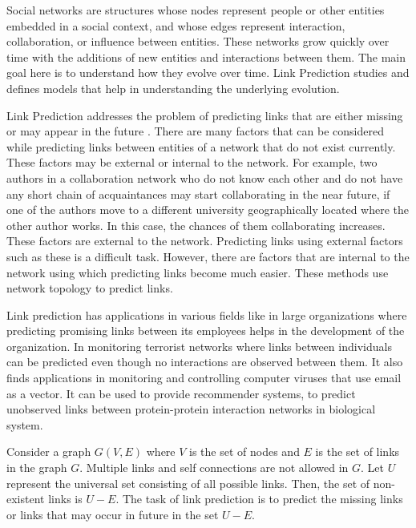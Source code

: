 Social networks are structures whose nodes represent people or other entities embedded in a social context, and whose edges represent interaction, collaboration, or influence between entities. These networks grow quickly over time with the additions of new entities and interactions between them. The main goal here is to understand how they evolve over time. Link Prediction studies and defines models that help in understanding the underlying evolution.

Link Prediction addresses the problem of predicting links that are either missing or may appear in the future \cite{liben2007link}. There are many factors that can be considered while predicting links between entities of a network that do not exist currently. These factors may be external or internal to the network. For example, two authors in a collaboration network who do not know each other and do not have any short chain of acquaintances may start collaborating in the near future, if one of the authors move to a different university geographically located where the other author works. In this case, the chances of them collaborating increases. These factors are external to the network. Predicting links using external factors such as these is a difficult task. However, there are factors that are internal to the network using which predicting links become much easier. These methods use network topology to predict links. 

Link prediction has applications in various fields like in large organizations where predicting promising links between its employees helps in the development of the organization. In monitoring terrorist networks where links between individuals can be predicted even though no interactions are observed between them. It also finds applications in monitoring and controlling computer viruses that use email as a vector. It can be used to provide recommender systems, to predict unobserved links between protein-protein interaction networks in biological system.


Consider a graph $G (V, E)$ where $V$ is the set of nodes and $E$ is the set of links in the graph $G$. Multiple links and self connections are not allowed in $G$. Let $U$ represent the universal set consisting of all possible links. Then, the set of non-existent links is $U-E$. The task of link prediction is to predict the missing links or links that may occur in future in the set $U-E$. 


